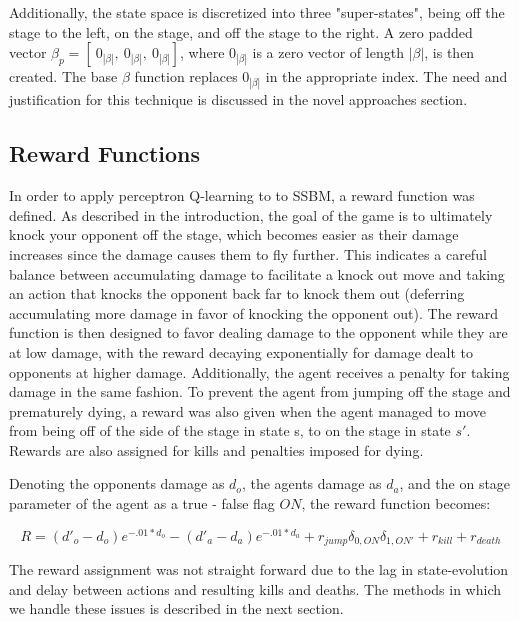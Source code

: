 Additionally, the state space is discretized into three "super-states", being off the stage to the left, on the stage, and off the stage to the right. A zero padded vector $\beta_{p} = [~0_{|\beta|},~0_{|\beta|},~0_{|\beta|}]$, where  $0_{|\beta|}$ is a zero vector of length $|\beta|$,  is then created. The base $\beta$ function replaces $0_{|\beta|}$ in the appropriate index. The need and justification for this technique is discussed in the novel approaches section.

\subsection{Reward Functions}

In order to apply perceptron Q-learning to to SSBM, a reward function was defined. As described in the introduction, the goal of the game is to ultimately knock your opponent off the stage, which becomes easier as their damage increases since the damage causes them to fly further. This indicates a careful balance between accumulating damage to facilitate a knock out move and taking an action that knocks the opponent back far to knock them out (deferring accumulating more damage in favor of knocking the opponent out). The reward function is then designed to favor dealing damage to the opponent while they are at low damage, with the reward decaying exponentially for damage dealt to opponents at higher damage. Additionally, the agent receives a penalty for taking damage in the same fashion. To prevent the agent from jumping off the stage and prematurely dying, a reward was also given when the agent managed to move from being off of the side of the stage in state s, to on the stage in state $s'$. Rewards are also assigned for kills and penalties imposed for dying.

Denoting the opponents damage as $d_o$, the agents damage as $d_a$, and the on stage parameter of the agent as a true - false flag $ON$, the reward function becomes:

\vspace{-6mm}
\begin{equation}
R = (d'_o-d_o)e^{-.01*d_o} - (d'_a-d_a)e^{-.01*d_a} + r_{jump}\delta_{0,ON}\delta_{1,ON'}  + r_{kill} + r_{death}
\end{equation}
\vspace{-8mm}

The reward assignment was not straight forward due to the lag in state-evolution and delay between actions and resulting kills and deaths. The methods in which we handle these issues is described in the next section.
